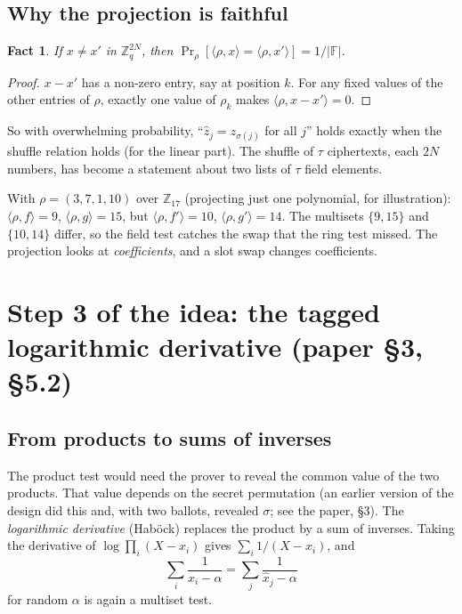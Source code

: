 \documentclass[11pt,a4paper]{article}
\newcommand{\Z}{\mathbb{Z}}
\newcommand{\Zq}{\mathbb{Z}_q}
\newcommand{\F}{\mathbb{F}}
\newcommand{\ip}[2]{\langle #1, #2\rangle}
\newcommand{\zh}{\hat{z}}
\theoremstyle{definition}
\theoremstyle{plain}
\newtheorem{fact}[definition]{Fact}
\begin{document}
\subsection{Why the projection is faithful}

\begin{fact}
If $x\neq x'$ in $\Zq^{2N}$, then $\Pr_\rho[\ip{\rho}{x}=\ip{\rho}{x'}]=1/|\F|$.
\end{fact}
\begin{proof}
$x-x'$ has a non-zero entry, say at position $k$. For any fixed values of the other entries of $\rho$,
exactly one value of $\rho_k$ makes $\ip{\rho}{x-x'}=0$.
\end{proof}

So with overwhelming probability, ``$\zh_j=z_{\sigma(j)}$ for all $j$'' holds exactly when the shuffle
relation holds (for the linear part). The shuffle of $\tau$ ciphertexts, each $2N$ numbers, has become a
statement about two lists of $\tau$ field elements.

\begin{example}
With $\rho=(3,7,1,10)$ over $\Z_{17}$ (projecting just one polynomial, for illustration):
$\ip{\rho}{f}=9$, $\ip{\rho}{g}=15$, but $\ip{\rho}{f'}=10$, $\ip{\rho}{g'}=14$. The multisets $\{9,15\}$
and $\{10,14\}$ differ, so the field test catches the swap that the ring test missed. The projection
looks at \emph{coefficients}, and a slot swap changes coefficients.
\end{example}

\section{Step 3 of the idea: the tagged logarithmic derivative (paper \S3, \S5.2)}
\label{sec:logder}

\subsection{From products to sums of inverses}

The product test would need the prover to reveal the common value of the two products. That value
depends on the secret permutation (an earlier version of the design did this and, with two ballots,
revealed $\sigma$; see the paper, \S3). The \emph{logarithmic derivative} (Hab\"ock) replaces the
product by a sum of inverses. Taking the derivative of $\log\prod_i(X-x_i)$ gives
$\sum_i 1/(X-x_i)$, and
\[
  \sum_i\frac{1}{x_i-\alpha}=\sum_j\frac{1}{\hat x_j-\alpha}
\]
for random $\alpha$ is again a multiset test.
\end{document}
